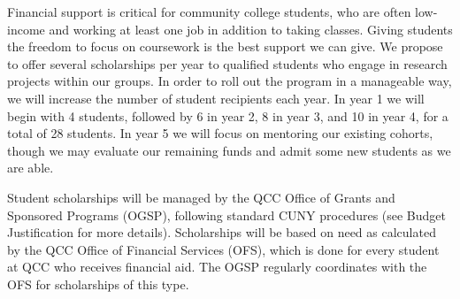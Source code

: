 \documentclass[12pt]{article}
\begin{document}



Financial support is critical for community college students, who are often low-income and working at least one job in addition to taking classes.  Giving students the freedom to focus on coursework is the best support we can give.  We propose to offer several scholarships per year to qualified students who engage in research projects within our groups.  In order to roll out the program in a manageable way, we will increase the number of student recipients each year.  In year 1 we will begin with 4 students, followed by 6 in year 2, 8 in year 3, and 10 in year 4, for a total of 28 students.  In year 5 we will focus on mentoring our existing cohorts, though we may evaluate our remaining funds and admit some new students as we are able.

Student scholarships will be managed by the QCC Office of Grants and Sponsored Programs (OGSP), following standard CUNY procedures (see Budget Justification for more details).  Scholarships will be based on need as calculated by the QCC Office of Financial Services (OFS), which is done for every student at QCC who receives financial aid.  The OGSP regularly coordinates with the OFS for scholarships of this type.  
\end{document}
